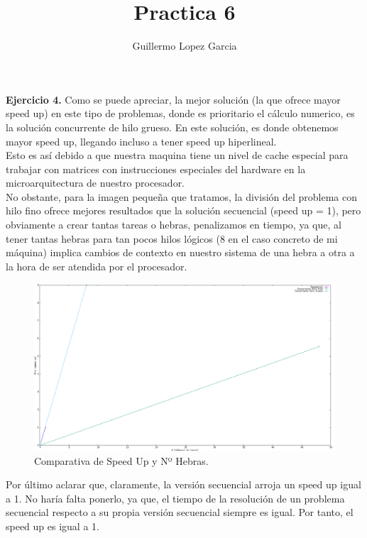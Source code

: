 \documentclass[]{article}
\title{Practica 6}
\author{Guillermo Lopez Garcia}
\begin{document}
\maketitle

\textbf{Ejercicio 4.}
Como se puede apreciar, la mejor solución (la que ofrece mayor speed up) en este tipo de problemas,
donde es prioritario el cálculo numerico, es la solución concurrente de hilo grueso. En este solución,
es donde obtenemos mayor speed up, llegando incluso a tener speed up hiperlineal. \\

Esto es así debido a que nuestra maquina tiene un nivel de cache especial para trabajar con matrices
con instrucciones especiales del hardware en la microarquitectura de nuestro procesador. \\

No obstante, para la imagen pequeña que tratamos, la división del problema con hilo fino ofrece mejores
resultados que la solución secuencial (speed up = 1), pero obviamente a crear tantas tareas o hebras,
penalizamos en tiempo, ya que, al tener tantas hebras para tan pocos hilos lógicos (8 en el caso concreto de
mi máquina) implica cambios de contexto en nuestro sistema de una hebra a otra a la hora de ser atendida
por el procesador. \\

\begin{figure}
\centering
\includegraphics[width=\linewidth]{img.png}
\caption{Comparativa de Speed Up y Nº Hebras.}
\label{fig:comp}
\end{figure}

Por último aclarar que, claramente, la versión secuencial arroja un speed up igual a 1. No haría falta
ponerlo, ya que, el tiempo de la resolución de un problema secuencial respecto a su propia versión
secuencial siempre es igual. Por tanto, el speed up es igual a 1.
\end{document}
